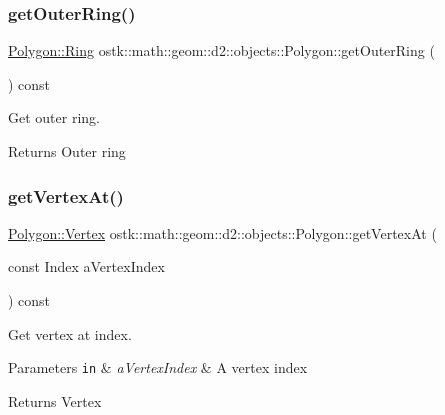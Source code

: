 \subsubsection{\texorpdfstring{get\+Outer\+Ring()}{getOuterRing()}}
{\footnotesize\ttfamily \hyperlink{classostk_1_1math_1_1geom_1_1d2_1_1objects_1_1_polygon_a2cfc117e0bd669946a670640eae4ee4c}{Polygon\+::\+Ring} ostk\+::math\+::geom\+::d2\+::objects\+::\+Polygon\+::get\+Outer\+Ring (\begin{DoxyParamCaption}{ }\end{DoxyParamCaption}) const}



Get outer ring. 

\begin{DoxyReturn}{Returns}
Outer ring 
\end{DoxyReturn}
\mbox{\label{classostk_1_1math_1_1geom_1_1d2_1_1objects_1_1_polygon_af3eff08fe9f9c74c5d9aebe7fb5f888f}} 
\subsubsection{\texorpdfstring{get\+Vertex\+At()}{getVertexAt()}}
{\footnotesize\ttfamily \hyperlink{classostk_1_1math_1_1geom_1_1d2_1_1objects_1_1_polygon_a2fdf6254b42f087bd9cd0b8b0d7df91c}{Polygon\+::\+Vertex} ostk\+::math\+::geom\+::d2\+::objects\+::\+Polygon\+::get\+Vertex\+At (\begin{DoxyParamCaption}\item[{const Index}]{a\+Vertex\+Index }\end{DoxyParamCaption}) const}



Get vertex at index. 


\begin{DoxyParams}[1]{Parameters}
\mbox{\tt in}  & {\em a\+Vertex\+Index} & A vertex index \\
\hline
\end{DoxyParams}
\begin{DoxyReturn}{Returns}
Vertex 
\end{DoxyReturn}
\mbox{\label{classostk_1_1math_1_1geom_1_1d2_1_1objects_1_1_polygon_ac53efcb8236507a884323d5db2dd5cdf}} 
